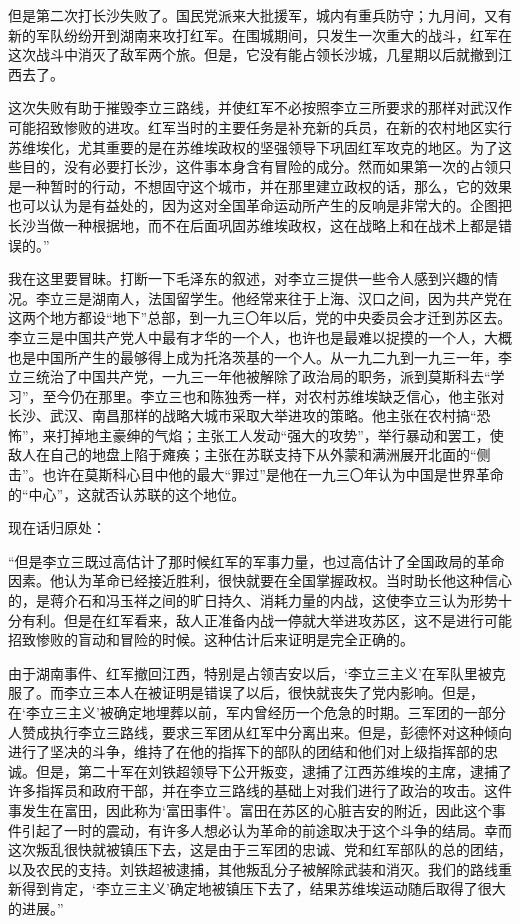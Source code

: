 \documentclass[10pt]{book}
\begin{document}
但是第二次打长沙失败了。国民党派来大批援军，城内有重兵防守；九月间，又有新的军队纷纷开到湖南来攻打红军。在围城期间，只发生一次重大的战斗，红军在这次战斗中消灭了敌军两个旅。但是，它没有能占领长沙城，几星期以后就撤到江西去了。

这次失败有助于摧毁李立三路线，并使红军不必按照李立三所要求的那样对武汉作可能招致惨败的进攻。红军当时的主要任务是补充新的兵员，在新的农村地区实行苏维埃化，尤其重要的是在苏维埃政权的坚强领导下巩固红军攻克的地区。为了这些目的，没有必要打长沙，这件事本身含有冒险的成分。然而如果第一次的占领只是一种暂时的行动，不想固守这个城市，并在那里建立政权的话，那么，它的效果也可以认为是有益处的，因为这对全国革命运动所产生的反响是非常大的。企图把长沙当做一种根据地，而不在后面巩固苏维埃政权，这在战略上和在战术上都是错误的。”

我在这里要冒昧。打断一下毛泽东的叙述，对李立三提供一些令人感到兴趣的情况。李立三是湖南人，法国留学生。他经常来往于上海、汉口之间，因为共产党在这两个地方都设“地下”总部，到一九三〇年以后，党的中央委员会才迁到苏区去。李立三是中国共产党人中最有才华的一个人，也许也是最难以捉摸的一个人，大概也是中国所产生的最够得上成为托洛茨基的一个人。从一九二九到一九三一年，李立三统治了中国共产党，一九三一年他被解除了政治局的职务，派到莫斯科去“学习”，至今仍在那里。李立三也和陈独秀一样，对农村苏维埃缺乏信心，他主张对长沙、武汉、南昌那样的战略大城市采取大举进攻的策略。他主张在农村搞“恐怖”，来打掉地主豪绅的气焰；主张工人发动“强大的攻势”，举行暴动和罢工，使敌人在自己的地盘上陷于瘫痪；主张在苏联支持下从外蒙和满洲展开北面的“侧击”。也许在莫斯科心目中他的最大“罪过”是他在一九三〇年认为中国是世界革命的“中心”，这就否认苏联的这个地位。

现在话归原处：

“但是李立三既过高估计了那时候红军的军事力量，也过高估计了全国政局的革命因素。他认为革命已经接近胜利，很快就要在全国掌握政权。当时助长他这种信心的，是蒋介石和冯玉祥之间的旷日持久、消耗力量的内战，这使李立三认为形势十分有利。但是在红军看来，敌人正准备内战一停就大举进攻苏区，这不是进行可能招致惨败的盲动和冒险的时候。这种估计后来证明是完全正确的。

由于湖南事件、红军撤回江西，特别是占领吉安以后，‘李立三主义’在军队里被克服了。而李立三本人在被证明是错误了以后，很快就丧失了党内影响。但是，在‘李立三主义’被确定地埋葬以前，军内曾经历一个危急的时期。三军团的一部分人赞成执行李立三路线，要求三军团从红军中分离出来。但是，彭德怀对这种倾向进行了坚决的斗争，维持了在他的指挥下的部队的团结和他们对上级指挥部的忠诚。但是，第二十军在刘铁超领导下公开叛变，逮捕了江西苏维埃的主席，逮捕了许多指挥员和政府干部，并在李立三路线的基础上对我们进行了政治的攻击。这件事发生在富田，因此称为‘富田事件’。富田在苏区的心脏吉安的附近，因此这个事件引起了一时的震动，有许多人想必认为革命的前途取决于这个斗争的结局。幸而这次叛乱很快就被镇压下去，这是由于三军团的忠诚、党和红军部队的总的团结，以及农民的支持。刘铁超被逮捕，其他叛乱分子被解除武装和消灭。我们的路线重新得到肯定，‘李立三主义’确定地被镇压下去了，结果苏维埃运动随后取得了很大的进展。”
\end{document}
